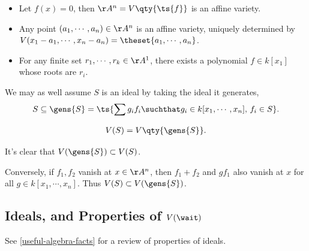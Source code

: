 \begin{example}

\envlist

\begin{itemize}
\tightlist
\item
  Let \(f(x) = 0\), then \(\AA^n = V\qty{\ts{f}}\) is an affine variety.
\item
  Any point \((a_1, \cdots, a_n)\in \AA^n\) is an affine variety,
  uniquely determined by
  \(V(x_1 - a_1, \cdots, x_n - a_n) = \theset{a_1, \cdots, a_n}\).
\item
  For any finite set \(r_1, \cdots, r_k \in \AA^1\), there exists a
  polynomial \(f\in k[x_1]\) whose roots are \(r_i\).
\end{itemize}

\end{example}

\begin{remark}

We may as well assume \(S\) is an ideal by taking the ideal it
generates,
\begin{align*}
S\subseteq \gens{S} = \ts{\sum g_i f_i \suchthat g_i \in k[x_1, \cdots, x_n],\, f_i\in S}
.\end{align*}

\begin{claim}

\begin{align*}  
V(S) = V\qty{\gens{S}}
.\end{align*}

\end{claim}

It's clear that \(V(\gens{S}) \subset V(S)\).

Conversely, if \(f_1, f_2\) vanish at \(x\in \AA^n\), then \(f_1 + f_2\)
and \(gf_1\) also vanish at \(x\) for all \(g\in k[x_1, \cdots, x_n]\).
Thus \(V(S) \subset V(\gens{S})\).

\end{remark}

\hypertarget{ideals-and-properties-of-vwait}{%
\subsection{\texorpdfstring{Ideals, and Properties of
\(V(\wait)\)}{Ideals, and Properties of V(\textbackslash wait)}}\label{ideals-and-properties-of-vwait}}

See \cref{useful-algebra-facts} for a review of properties of ideals.

